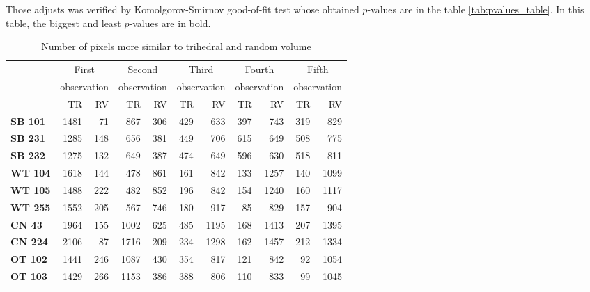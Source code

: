 \documentclass[12pt]{article}
\begin{document}
Those adjusts was verified by Komolgorov-Smirnov good-of-fit test whose obtained $p$-values are in the table \ref{tab:pvalues_table}. In this table, the biggest and least $p$-values are in bold.

\begin{table}[hbt]
\centering
\caption{Number of pixels more similar to trihedral and random volume}\label{tab:size_sample}
\begin{tabular}{lrrrrrrrrrr}

\toprule
& \multicolumn{2}{c}{First} & \multicolumn{2}{c}{Second} & \multicolumn{2}{c}{Third} & \multicolumn{2}{c}{Fourth} & \multicolumn{2}{c}{Fifth}\\
& \multicolumn{2}{c}{observation} & \multicolumn{2}{c}{observation} & \multicolumn{2}{c}{observation} & \multicolumn{2}{c}{observation} & \multicolumn{2}{c}{observation}\\
& TR & RV & TR & RV & TR & RV & TR & RV& TR & RV\\
\cmidrule(lr){2-11}
\textbf{SB 101} & 1481 & 71 & 867 & 306 & 429 & 633 & 397 & 743 & 319 & 829\\
\textbf{SB 231} & 1285 & 148 & 656 & 381 & 449 & 706 & 615 & 649 & 508 & 775\\
\textbf{SB 232} & 1275 & 132 & 649 & 387 & 474 & 649 & 596 & 630 & 518 & 811\\
\textbf{WT 104} & 1618 & 144 & 478 & 861 & 161 & 842 & 133 & 1257 & 140 & 1099\\
\textbf{WT 105} & 1488 & 222 & 482 & 852 & 196 & 842 & 154 & 1240 & 160 & 1117\\
\textbf{WT 255} & 1552 & 205 & 567 & 746 & 180 & 917 & 85 & 829 & 157 & 904\\
\textbf{CN 43}  & 1964 & 155 & 1002 & 625 & 485 & 1195 & 168 & 1413 & 207 & 1395\\
\textbf{CN 224} & 2106 & 87 & 1716 & 209 & 234 & 1298 & 162 & 1457 & 212 & 1334\\
\textbf{OT 102} & 1441 & 246 & 1087 & 430 & 354 & 817 & 121 & 842 & 92 & 1054\\
\textbf{OT 103} & 1429 & 266 & 1153 & 386 & 388 & 806 & 110 & 833 & 99 & 1045\\
\bottomrule
\end{tabular} 
\end{table}
\end{document}
